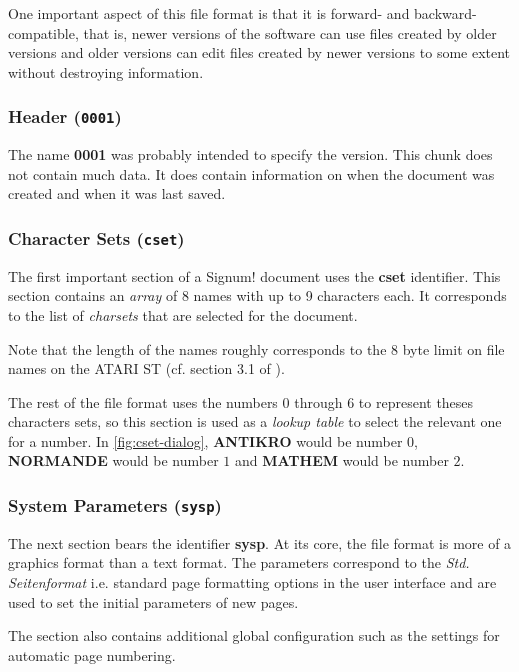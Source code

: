 One important aspect of this file format is that it is forward- and backward-compatible, that is, newer versions of the software can use files created by older versions and older versions can edit files created by newer versions to some extent without destroying information.

\subsubsection{Header (\texttt{0001})}
\label{sec:sdoc_0001}

The name \textbf{0001} was probably intended to specify the version. This chunk does not contain much data. It does contain information on when the document was created and when it was last saved.

\subsubsection{Character Sets (\texttt{cset})}
\label{sec:sdoc_cset}

The first important section of a Signum! document uses the \textbf{cset} identifier. This section contains an \textit{array} of 8 names with up to 9 characters each. It corresponds to the list of \textit{charsets} that are selected for the document.

Note that the length of the names roughly corresponds to the 8 \gls{byte} limit on file names on the ATARI ST (cf. section 3.1 of \cite{guerin2014filesystem}).

The rest of the file format uses the numbers $0$ through $6$ to represent theses characters sets, so this section is used as a \textit{lookup table} to select the relevant one for a number. In \autoref{fig:cset-dialog}, \textbf{ANTIKRO} would be number $0$, \textbf{NORMANDE} would be number $1$ and \textbf{MATHEM} would be number $2$.

\subsubsection{System Parameters (\texttt{sysp})}
\label{sec:sdoc_sysp}

The next section bears the identifier \textbf{sysp}. At its core, the \Signum{} file format is more of a graphics format than a text format. The parameters correspond to the \textit{Std. Seitenformat} i.e. standard page formatting options in the user interface and are used to set the initial parameters of new pages.

The section also contains additional global configuration such as the settings for automatic page numbering.

